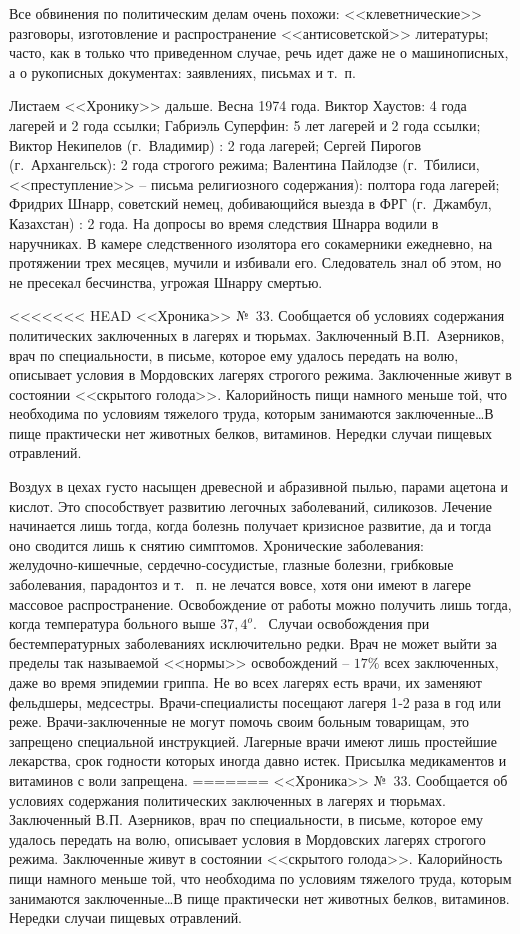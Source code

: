 \documentclass{book}
\begin{document}
Все обвинения по политическим делам очень похожи: <<клеветнические>> разговоры, изготовление и распространение <<антисоветской>> литературы; часто, как в только что приведенном случае, речь идет даже не о машинописных, а о рукописных документах: заявлениях, письмах и т.~п.

Листаем <<Хронику>> дальше. Весна 1974 года. Виктор Хаустов: 4 года лагерей и 2 года ссылки; Габриэль Суперфин:
5 лет лагерей и 2 года ссылки; Виктор Некипелов (г.~Владимир) : 2 года лагерей; Сергей Пирогов (г.~Архангельск): 2 го­да строгого режима; Валентина Пайлодзе (г.~Тбилиси, <<преступление>> -- письма религиозного содержания): полтора года лагерей; Фридрих Шнарр, советский немец, добивающийся выезда в ФРГ (г.~Джамбул, Казахстан) : 2 года. На допросы во время следствия Шнарра водили в наручниках. В камере след­ственного изолятора его сокамерники ежедневно, на протяжении трех месяцев, мучили и избивали его. Следователь знал об этом, но не пресекал бесчинства, угрожая Шнарру смертью.

<<<<<<< HEAD
<<Хроника>> №~33. Сообщается об условиях содержания политических заключенных в лагерях и тюрьмах. Заключенный В.П.~Азерников, врач по специальности, в письме, которое ему удалось передать на волю, описывает условия в Мордовских лагерях строгого режима.
Заключенные живут в состоянии <<скрытого голода>>. Калорийность пищи намного меньше той, что необходима по усло­виям тяжелого труда, которым занимаются заключенные\ldots В пище практически нет животных белков, витаминов. Нередки случаи пищевых отравлений.

Воздух в цехах густо насыщен древесной и абразивной пылью, парами ацетона и кислот. Это способствует развитию легочных заболеваний, силикозов. Лечение начинается лишь тогда, когда болезнь получает кризисное развитие, да и тогда оно сводится лишь к снятию симптомов. Хронические заболевания: желудочно‑кишечные, сердечно‑сосудистые, глазные болезни, грибковые заболевания, парадонтоз и т.~ п. не лечатся вовсе, хотя они имеют в лагере массовое распространение. Освобождение от работы можно получить лишь тогда, когда температура больного выше $37,4^{o}$.  Случаи освобождения при бестемпературных заболеваниях исключительно редки. Врач не может выйти за пределы так называемой <<нормы>> освобождений -- $17\%$ всех заключенных, даже во время эпидемии гриппа. Не во всех лагерях есть врачи, их заменяют фельдшеры, медсестры. Врачи‑специалисты посещают лагеря 1‑2 раза в год или реже. Врачи‑заключенные не могут помочь своим больным товарищам, это запрещено специальной инструкцией. Лагерные врачи имеют лишь простейшие лекарства, срок годности кото­рых иногда давно истек. Присылка медикаментов и витаминов с воли запрещена.
=======
<<Хроника>> №~33. Сообщается об условиях содержания политических заключенных в лагерях и тюрьмах. Заключенный В.П. Азерников, врач по специальности, в письме, которое ему удалось передать на волю, описывает условия в Мордовских лагерях строгого режима.
Заключенные живут в состоянии <<скрытого голода>>. Калорийность пищи намного меньше той, что необходима по усло­виям тяжелого труда, которым занимаются заключенные\ldots В пище практически нет животных белков, витаминов. Нередки случаи пищевых отравлений.
\end{document}
